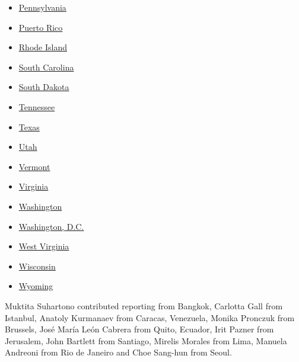 \begin{itemize}
\item
  \href{https://www.nytimes.com/interactive/2020/us/pennsylvania-coronavirus-cases.html}{Pennsylvania}
\item
  \href{https://www.nytimes.com/interactive/2020/us/puerto-rico-coronavirus-cases.html}{Puerto
  Rico}
\item
  \href{https://www.nytimes.com/interactive/2020/us/rhode-island-coronavirus-cases.html}{Rhode
  Island}
\item
  \href{https://www.nytimes.com/interactive/2020/us/south-carolina-coronavirus-cases.html}{South
  Carolina}
\item
  \href{https://www.nytimes.com/interactive/2020/us/south-dakota-coronavirus-cases.html}{South
  Dakota}
\item
  \href{https://www.nytimes.com/interactive/2020/us/tennessee-coronavirus-cases.html}{Tennessee}
\item
  \href{https://www.nytimes.com/interactive/2020/us/texas-coronavirus-cases.html}{Texas}
\item
  \href{https://www.nytimes.com/interactive/2020/us/utah-coronavirus-cases.html}{Utah}
\item
  \href{https://www.nytimes.com/interactive/2020/us/vermont-coronavirus-cases.html}{Vermont}
\item
  \href{https://www.nytimes.com/interactive/2020/us/virginia-coronavirus-cases.html}{Virginia}
\item
  \href{https://www.nytimes.com/interactive/2020/us/washington-coronavirus-cases.html}{Washington}
\item
  \href{https://www.nytimes.com/interactive/2020/us/washington-dc-coronavirus-cases.html}{Washington,
  D.C.}
\item
  \href{https://www.nytimes.com/interactive/2020/us/west-virginia-coronavirus-cases.html}{West
  Virginia}
\item
  \href{https://www.nytimes.com/interactive/2020/us/wisconsin-coronavirus-cases.html}{Wisconsin}
\item
  \href{https://www.nytimes.com/interactive/2020/us/wyoming-coronavirus-cases.html}{Wyoming}
\end{itemize}

Muktita Suhartono contributed reporting from Bangkok, Carlotta Gall from
Istanbul, Anatoly Kurmanaev from Caracas, Venezuela, Monika Pronczuk
from Brussels, José María León Cabrera from Quito, Ecuador, Irit Pazner
from Jerusalem, John Bartlett from Santiago, Mirelis Morales from Lima,
Manuela Andreoni from Rio de Janeiro and Choe Sang-hun from Seoul.

